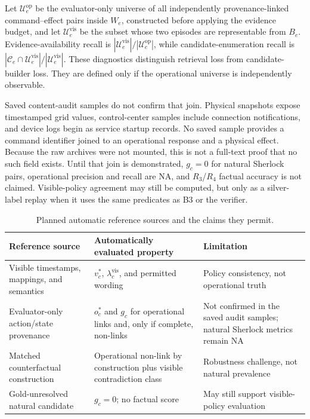 \documentclass[conference]{IEEEtran}
\newcommand{\NA}{\textsc{NA}}
\begin{document}
Let $\mathcal U_e^{\mathrm{op}}$ be the evaluator-only universe of all independently provenance-linked command--effect pairs inside $W_e$, constructed before applying the evidence budget, and let $\mathcal U_e^{\mathrm{vis}}$ be the subset whose two episodes are representable from $B_e$. Evidence-availability recall is $|\mathcal U_e^{\mathrm{vis}}|/|\mathcal U_e^{\mathrm{op}}|$, while candidate-enumeration recall is $|\mathcal C_e\cap\mathcal U_e^{\mathrm{vis}}|/|\mathcal U_e^{\mathrm{vis}}|$. These diagnostics distinguish retrieval loss from candidate-builder loss. They are defined only if the operational universe is independently observable.

Saved content-audit samples do not confirm that join. Physical snapshots expose timestamped grid values, control-center samples include connection notifications, and device logs begin as service startup records. No saved sample provides a command identifier joined to an operational response and a physical effect. Because the raw archives were not mounted, this is not a full-text proof that no such field exists. Until that join is demonstrated, $g_c=0$ for natural Sherlock pairs, operational precision and recall are \NA{}, and $R_3$/$R_4$ factual accuracy is not claimed. Visible-policy agreement may still be computed, but only as a silver-label replay when it uses the same predicates as B3 or the verifier.

\begin{table}[t]
\caption{Planned automatic reference sources and the claims they permit.}
\label{tab:reference-sources}
\centering\footnotesize
\begin{tabularx}{\textwidth}{@{}l X X@{}}
\toprule
Reference source & Automatically evaluated property & Limitation\\
\midrule
Visible timestamps, mappings, and semantics & $v_c^*$, $\lambda_c^{\mathrm{vis}}$, and permitted wording & Policy consistency, not operational truth\\
Evaluator-only action/state provenance & $o_c^*$ and $g_c$ for operational links and, only if complete, non-links & Not confirmed in the saved audit samples; natural Sherlock metrics remain \NA{}\\
Matched counterfactual construction & Operational non-link by construction plus visible contradiction class & Robustness challenge, not natural prevalence\\
Gold-unresolved natural candidate & $g_c=0$; no factual score & May still support visible-policy evaluation\\
\bottomrule
\end{tabularx}
\end{table}
\end{document}
